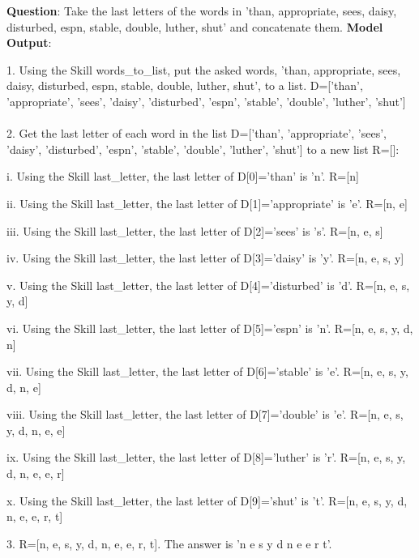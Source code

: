 \documentclass{article} \usepackage{arxiv}
\begin{document}
\begin{tcolorbox}[title = {Last Letter Concatenation}, colback = Apricot!25!white, colframe = BrickRed!75!black] 
\textbf{Question}: Take the last letters of the words in 'than, appropriate, sees, daisy, disturbed, espn, stable, double, luther, shut' and concatenate them.
\tcblower
\textbf{Model Output}:

\quad

1. Using the Skill words\_to\_list, put the asked words, 'than, appropriate, sees, daisy, disturbed, espn, stable, double, luther, shut', to a list.  D=['than', 'appropriate', 'sees', 'daisy', 'disturbed', 'espn', 'stable', 'double', 'luther', 'shut'] \\ \\
2. Get the last letter of each word in the list D=['than', 'appropriate', 'sees', 'daisy', 'disturbed', 'espn', 'stable', 'double', 'luther', 'shut'] to a new list R=[]: 

\quad

   \qquad i. Using the Skill last\_letter, the last letter of D[0]='than' is 'n'. R=[n] 
   
   \qquad ii. Using the Skill last\_letter, the last letter of D[1]='appropriate' is 'e'. R=[n, e] 
   
   \qquad iii. Using the Skill last\_letter, the last letter of D[2]='sees' is 's'. R=[n, e, s] 
   
   \qquad iv. Using the Skill last\_letter, the last letter of D[3]='daisy' is 'y'. R=[n, e, s, y] 
   
   \qquad v. Using the Skill last\_letter, the last letter of D[4]='disturbed' is 'd'. R=[n, e, s, y, d] 
   
   \qquad vi. Using the Skill last\_letter, the last letter of D[5]='espn' is 'n'. R=[n, e, s, y, d, n] 
   
   \qquad vii. Using the Skill last\_letter, the last letter of D[6]='stable' is 'e'. R=[n, e, s, y, d, n, e] 
   
   \qquad viii. Using the Skill last\_letter, the last letter of D[7]='double' is 'e'. R=[n, e, s, y, d, n, e, e] 
   
   \qquad ix. Using the Skill last\_letter, the last letter of D[8]='luther' is 'r'. R=[n, e, s, y, d, n, e, e, r] 
   
   \qquad x. Using the Skill last\_letter, the last letter of D[9]='shut' is 't'. R=[n, e, s, y, d, n, e, e, r, t] 

\quad

3. R=[n, e, s, y, d, n, e, e, r, t]. The answer is 'n e s y d n e e r t'. 
\end{tcolorbox}
\noindent\begin{minipage}{\textwidth}
 \label{Tab:example_last_letter_skill}
\end{minipage}
\end{document}
